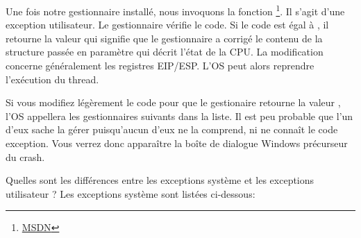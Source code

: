 

Une fois notre gestionnaire installé, nous invoquons la fonction 
\footnote{\href{http://go.yurichev.com/17253}{MSDN}}.
Il s'agit d'une exception utilisateur.
Le gestionnaire vérifie le code.
Si le code est égal à , il retourne la valeur  qui
signifie que le gestionnaire a corrigé le contenu de la structure passée en paramètre qui décrit
l'état de la CPU. La modification concerne généralement les registres EIP/ESP. L'\ac{OS} peut alors
reprendre l'exécution du thread.

Si vous modifiez légèrement le code pour que le gestionaire retourne la valeur ,
l'\ac{OS} appellera les gestionnaires suivants dans la liste. Il est peu probable que l'un d'eux sache
la gérer puisqu'aucun d'eux ne la comprend, ni ne connaît le code exception.
Vous verrez donc apparaître la boîte de dialogue Windows précurseur du crash.

Quelles sont les différences entre les exceptions système et les exceptions utilisateur ?
Les exceptions système sont listées ci-dessous:

